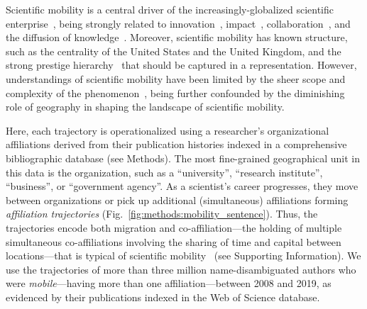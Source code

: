 \documentclass[12pt]{article} %
\def\SI{Supporting Information}
\begin{document}
Scientific mobility is a central driver of the increasingly-globalized scientific enterprise~\autocite{czaika2018globalisation, altbach2004globalization, box2008competition}, being strongly related to innovation~\autocite{braunerhjelm2020labor, kaiser2018innovation, armano2017innovation}, impact~\autocite{sugimoto2017mostimpact, petersen2018multiscale, franzoni2014advantage}, collaboration~\autocite{rodrigues2016mobility}, and the diffusion of knowledge~\autocite{braunerhjelm2020labor, azoulay2011diffusion, morgan2018prestige}.
Moreover, scientific mobility has known structure, such as the centrality of the United States and the United Kingdom, and the strong prestige hierarchy~\autocite{auriol2010careers, clauset2015hierarchy, deville2014career} that should be captured in a representation.
However, understandings of scientific mobility have been limited by the sheer scope and complexity of the phenomenon~\autocite{robinson2019mobility, vannoorden2012mobility, deville2014career, ackers2008mobility, scott2015dynamics}, being further confounded by the diminishing role of geography in shaping the landscape of scientific mobility.

Here, each trajectory is operationalized using a researcher's organizational affiliations derived from their publication histories indexed in a comprehensive bibliographic database (see Methods).
The most fine-grained geographical unit in this data is the organization, such as a ``university'', ``research institute'', ``business'', or ``government agency''.
As a scientist's career progresses, they move between organizations or pick up additional (simultaneous) affiliations forming \textit{affiliation trajectories} (Fig.~\ref{fig:methods:mobility_sentence}).
Thus, the trajectories encode both migration and co-affiliation---the holding of multiple simultaneous co-affiliations involving the sharing of time and capital between locations---that is typical of scientific mobility~\autocite{rodrigues2016mobility, markova2016synchronous, sugimoto2017mostimpact} (see \SI).
We use the trajectories of more than three million name-disambiguated authors who were \textit{mobile}---having more than one affiliation---between 2008 and 2019, as evidenced by their publications indexed in the Web of Science database.
\end{document}

